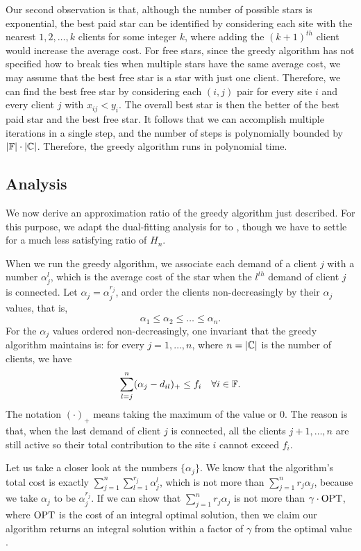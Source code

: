 \documentclass[oneside,final]{ucr}
\begin{document}
Our second observation is that, although the number of
possible stars is exponential, the best paid star can be
identified by considering each site with the nearest
$1,2,\ldots,k$ clients for some integer $k$, where adding
the $(k+1)^{th}$ client would increase the average cost. For
free stars, since the greedy algorithm has not specified how
to break ties when multiple stars have the same average
cost, we may assume that the best free star is a star with
just one client. Therefore, we can find the best free star
by considering each $(i,j)$ pair for every site $i$ and
every client $j$ with $x_{ij} < y_i$. The overall best star
is then the better of the best paid star and the best free
star. It follows that we can accomplish multiple iterations
in a single step, and the number of steps is polynomially
bounded by $|\mathbb{F}|\cdot|\mathbb{C}|$. Therefore, the
greedy algorithm runs in polynomial time.

\subsection{Analysis}
We now derive an approximation ratio of the greedy algorithm
just described. For this purpose, we adapt the dual-fitting
analysis for {\UFL} to {\FTFP}, though we have to settle for
a much less satisfying ratio of $H_n$.

When we run the greedy algorithm, we associate each demand
of a client $j$ with a number $\alpha_j^l$, which is the
average cost of the star when the $l^{th}$ demand of client
$j$ is connected. Let $\alpha_j = \alpha_j^{r_j}$, and order
the clients non-decreasingly by their $\alpha_j$ values,
that is,
\begin{equation*}
  \alpha_1 \leq \alpha_2 \leq \ldots \leq \alpha_n.
\end{equation*}
For the $\alpha_j$ values ordered non-decreasingly, one
invariant that the greedy algorithm maintains is: for every
$j=1,\ldots,n$, where $n=|\mathbb{C}|$ is the number of
clients, we have
\begin{equation*}
  \sum_{l=j}^n (\alpha_j - d_{il})_+ \leq f_i \quad \forall
  i \in \mathbb{F}.
\end{equation*}
The notation $(\cdot)_+$ means taking the maximum of the
value or $0$. The reason is that, when the last demand of
client $j$ is connected, all the clients $j+1,\ldots,n$ are
still active so their total contribution to the site $i$
cannot exceed $f_i$.

Let us take a closer look at the numbers $\{\alpha_j\}$. We
know that the algorithm's total cost is exactly
$\sum_{j=1}^n \sum_{l=1}^{r_j} \alpha_j^l$, which is not
more than $\sum_{j=1}^n r_j \alpha_j$, because we take
$\alpha_j$ to be $\alpha_j^{r_j}$.  If we can show that
$\sum_{j=1}^n r_j \alpha_j$ is not more than $\gamma \cdot
\mbox{\rm OPT}$, where $\mbox{\rm OPT}$ is the cost of an integral optimal
solution, then we claim our algorithm returns an integral
solution within a factor of $\gamma$ from the optimal value
\OPT.
\end{document}
